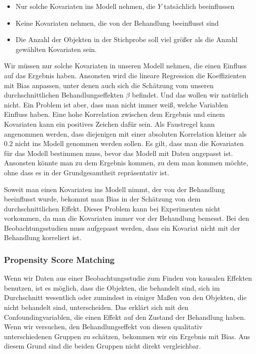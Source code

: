 \documentclass[12pt,a4paper,twoside]{scrartcl}
\numberwithin{equation}{section}
\begin{document}
\begin{itemize}
  \item Nur solche Kovariaten ins Modell nehmen, die $Y$ tatsächlich beeinflussen 
  \item Keine Kovariaten nehmen, die von der Behandlung beeinflusst sind
  \item Die Anzahl der Objekten in der Stichprobe soll viel größer als die Anzahl gewählten Kovariaten sein.
\end{itemize}

\noindent
Wir müssen nur solche Kovariaten in unseren Modell nehmen, die einen Einfluss auf das Ergebnis haben. Ansonsten wird die lineare Regression die Koeffizienten mit Bias anpassen, unter denen auch sich die Schätzung vom unseren durchschnittlichen Behandlungseffekten $\beta$ befindet. Und das wollen wir natürlich nicht. Ein Problem ist aber, dass man nicht immer weiß, welche Variablen Einfluss haben. Eine hohe Korrelation zwischen dem Ergebnis und einem Kovariaten kann ein positives Zeichen dafür sein. Als Faustregel kann angenommen werden, dass diejenigen mit einer absoluten Korrelation kleiner als 0.2 nicht ins Modell genommen werden sollen. Es gilt, dass man die Kovariaten für das Modell bestimmen muss, bevor das Modell mit Daten angepasst ist. Ansonsten könnte man zu dem Ergebnis kommen, zu dem man kommen möchte, ohne dass es in der Grundgesamtheit repräsentativ ist\cite{cox1982biometrics}\cite{WinLin}. \par

\noindent
Soweit man einen Kovariaten ins Modell nimmt, der von der Behandlung beeinflusst wurde, bekommt man Bias in der Schätzung von dem durchschnittlichen Effekt. Dieses Problem kann bei Experimenten nicht vorkommen, da man die Kovariaten immer vor der Behandlung bemesst. Bei den Beobachtungsstudien muss aufgepasst werden, dass ein Kovariat nicht mit der Behandlung korreliert ist.\cite{LinDol}\par

\subsubsection{Propensity Score Matching}\label{subsubsec:propensityScoreMatching}
Wenn wir Daten aus einer Beobachtungsstudie zum Finden von kausalen Effekten benutzen, ist es möglich, dass die Objekten, die behandelt sind, sich im Durchschnitt wesentlich oder zumindest in einiger Maßen von den Objekten, die nicht behandelt sind, unterscheiden. Das erklärt sich mit den Confoundingvariablen, die einen Effekt auf den Zustand der Behandlung haben. Wenn wir versuchen, den Behandlungseffekt von diesen qualitativ unterschiedenen Gruppen zu schätzen, bekommen wir ein Ergebnis mit Bias. Aus diesem Grund sind die beiden Gruppen nicht direkt vergleichbar.\par
\end{document}
